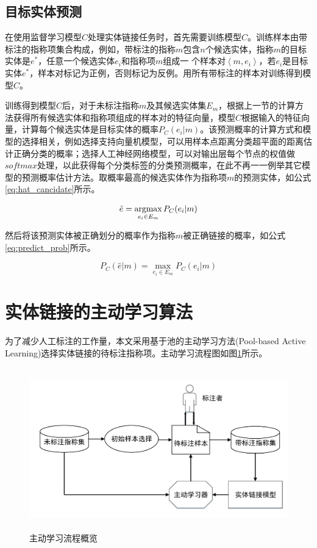 \subsection{目标实体预测}
在使用监督学习模型$C$处理实体链接任务时，首先需要训练模型$C$。训练样本由带标注的指称项集合构成，例如，带标注的指称$m$包含$n$个候选实体，指称$m$的目标实体是$e^*$，任意一个候选实体$e_i$和指称项$m$组成一 个样本对$\left\langle m,e_i\right\rangle $，若$e_i$是目标实体$e^*$，样本对标记为正例，否则标记为反例。用所有带标注的样本对训练得到模型$C$。

训练得到模型$C$后，对于未标注指称$m$及其候选实体集$E_m$，根据上一节的计算方法获得所有候选实体和指称项组成的样本对的特征向量，模型$C$根据输入的特征向量，计算每个候选实体是目标实体的概率$P_C(e_i|m)$。该预测概率的计算方式和模型的选择相关，例如选择支持向量机模型，可以用样本点距离分类超平面的距离估计正确分类的概率\cite{李航2012统计学习方法}；选择人工神经网络模型，可以对输出层每个节点的权值做$softmax$处理，以此获得每个分类标签的分类预测概率\cite{ravuri2016comparative}，在此不再一一例举其它模型的预测概率估计方法。取概率最高的候选实体作为指称项$m$的预测实体，如公式\ref{eq:hat_cancidate}所示。

\begin{equation}\label{eq:hat_cancidate}
\hat{e}=\operatorname*{argmax}_{e_i\in E_m} P_C(e_i|m)
\end{equation}

然后将该预测实体被正确划分的概率作为指称$m$被正确链接的概率，如公式\ref{eq:predict_prob}所示。

\begin{equation}\label{eq:predict_prob}
P_C(\hat{e}|m)=\max_{e_i\in E_m}P_C(e_i|m)
\end{equation}

\section{实体链接的主动学习算法}
为了减少人工标注的工作量，本文采用基于池的主动学习方法(Pool-based Active Learning)选择实体链接的待标注指称项。主动学习流程图如图\ref{fig:al_overview}所示。

\begin{figure}[!htb]
	\centering\includegraphics[height=7cm]{resource/al_overview}
	\caption{主动学习流程概览}
	\label{fig:al_overview}
\end{figure}

